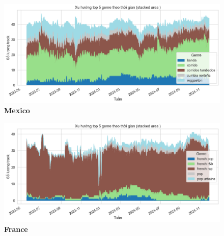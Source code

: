 \begin{itemize}
   
    \begin{figure}[H]
        \centering
        \begin{minipage}{0.45\textwidth}
            \centering
            \includegraphics[width=\linewidth]{../graphics/data_top50/figure/25/EDA_mexico.png}
            \\[4pt] {\small \textbf{Mexico}}
        \end{minipage}
        \hfill
        \begin{minipage}{0.45\textwidth}
            \centering
            \includegraphics[width=\linewidth]{../graphics/data_top50/figure/25/EDA_france.png}
            \\[4pt] {\small \textbf{France}}
        \end{minipage}

        \vspace{0.4cm}


\end{figure}
\end{itemize}
